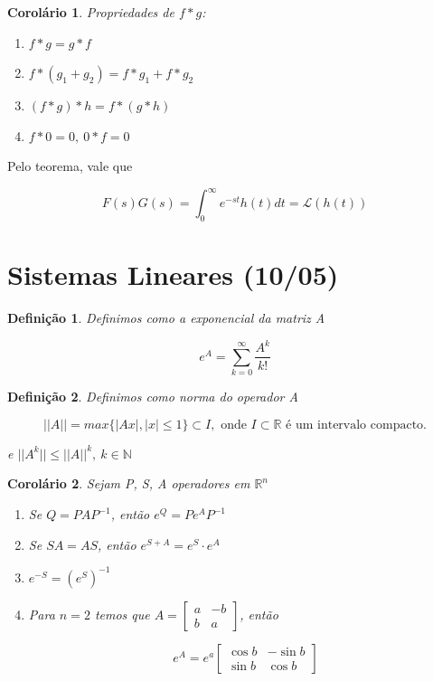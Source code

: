 \documentclass[12pt]{article}
\newtheorem{corollary}{Corolário}[theorem]
\newtheorem{definition}{Definição}
\begin{document}
\begin{corollary}
    Propriedades de $f * g$:
    
    \begin{enumerate}
        \item $f * g = g * f$
        \item $f * (g_1 + g_2) = f * g_1 + f * g_2$
        \item $(f * g) * h = f * (g * h)$
        \item $f * 0 = 0, \ 0 * f = 0$
    \end{enumerate}
\end{corollary}

Pelo teorema, vale que

$$F(s) G(s) = \int_0^\infty e^{- st} h(t) d t = \mathscr{L}(h(t))$$

\section{Sistemas Lineares (10/05)}
\begin{definition}
    Definimos como a exponencial da matriz A
    
    $$e^A = \sum_{k = 0}^\infty \frac{A^k}{k!}$$
\end{definition}

\begin{definition}
    Definimos como norma do operador A
    
    $$||A|| = max \{ |Ax|, |x| \leq 1 \} \subset I, \text{ onde } I \subset \mathbb{R} \text{ é um intervalo compacto.}$$
    
    e $||A^k|| \leq ||A||^k, \ k \in \mathbb{N}$ 
\end{definition}

\begin{corollary}
    Sejam P, S, A operadores em $\mathbb{R}^n$
    
    \begin{enumerate}
        \item Se $Q = P A P^{-1}$, então $e^Q = P e^A P^{-1}$
        
        \item Se $S A = A S$, então $e^{S + A} = e^S \cdot    e^A$
        
        \item $e^{-S} = (e^S)^{-1}$
        
        \item Para $n = 2$ temos que $ A = \left [ \begin{array}{cc}
             a & -b \\
             b & a
        \end{array} \right ]$, então
        
        $$e^A = e^a \left [ \begin{array}{cc}
             \cos{b} & -\sin{b} \\
             \sin{b} & \cos{b}
        \end{array} \right ]$$
    \end{enumerate}
\end{corollary}
\end{document}
